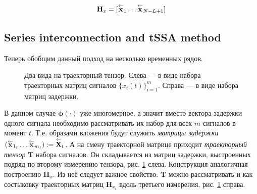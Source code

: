 	\[
		\mathbf{H}_x = [ \overset{\leftarrow}{\mathbf{x}}_{1} \ldots  \overset{\leftarrow}{\mathbf{x}}_{N - L + 1}]
	\]
	
	\subsection*{Series interconnection and tSSA method}\label{sec:tssa_method}
	
	Теперь обобщим данный подход на несколько временных рядов.
	
	\begin{figure}[h]
		\centering
		
		\caption{Два вида на траекторный тензор. Слева --- в виде набора траекторных матриц сигналов $ \{x_i(t)\}_{i=1}^m $. Справа --- в виде набора матриц задержки.}\label{pic:traj_tensor}
	\end{figure}
	
	В данном случае $ \boldsymbol{\phi}(\cdot) $ уже многомерное, а значит вместо вектора задержки одного сигнала необходимо рассматривать их набор для всех $ m $ сигналов в момент $ t $. Т.е. образами вложения будут служить \emph{матрицы задержки} $ ( \overset{\leftarrow}{\mathbf{x}}_{1_t} \ldots \overset{\leftarrow}{\mathbf{x}}_{m_t} ) := \overset{\leftarrow}{\mathbf{X}}_{t} $. А на смену траекторной матрице приходит \textit{траекторный тензор} $ \mathbf{T} $ набора сигналов. Он складывается из матриц задержки, выстроенных подряд по второму измерению тензора, рис. \ref{pic:traj_tensor} слева. Конструкция аналогичная построению $ \mathbf{H}_x $. Из неё следует важное свойство: $ \mathbf{T} $ можно рассматривать и как состыковку траекторных матриц $ \mathbf{H}_{x_i} $ вдоль третьего измерения, рис. \ref{pic:traj_tensor} справа.
	
